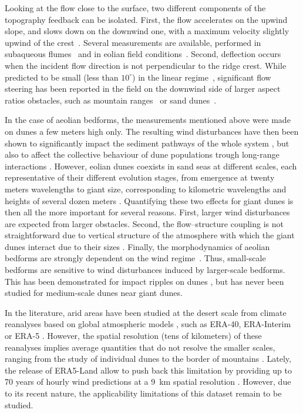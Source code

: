 Looking at the flow close to the surface, two different components of the topography feedback can be isolated. First, the flow accelerates on the upwind slope, and slows down on the downwind one, with a maximum velocity slightly upwind of the crest~\citep{Jackson1975, Sykes1980, Hunt1988}. Several measurements are available, performed in subaqueous flumes~\citep{Zilker1977, Zilker1979, Frederick1988} and in eolian field conditions~\citep{Claudin2013, Lu2021}. Second, deflection occurs when the incident flow direction is not perpendicular to the ridge crest. While predicted to be small (less than $10^{\circ}$) in the linear regime~\citep{Gadal2019}, significant flow steering has been reported in the field on the downwind side of larger aspect ratios obstacles, such as mountain ranges~\citep{Kim2000, Lewis2008, Fernando2019} or sand dunes~\citep{Walker2009, Walker2013, Hesp2015, Smith2017}.

In the case of aeolian bedforms, the measurements mentioned above were made on dunes a few meters high only. The resulting wind disturbances have then been shown to significantly impact the sediment pathways of the whole system \citep{Hesp2015}, but also to affect the collective behaviour of dune populations trough long-range interactions \citep{Bacik2020}.
%
However, eolian dunes coexists in sand seas at different scales, each representative of their different evolution stages, from emergence at twenty meters wavelengths to giant size, corresponding to kilometric wavelengths and heights of several dozen meters \citep{McKee1979}. Quantifying these two effects for giant dunes is then all the more important for several reasons.
%
First, larger wind disturbances are expected from larger obstacles.
%
Second, the flow--structure coupling is not straightforward due to vertical structure of the atmosphere with which the giant dunes interact due to their sizes \citep{andreotti2009}.
%
Finally, the morphodynamics of aeolian bedforms are strongly dependent on the wind regime~\citep{Livingstone1996}. Thus, small-scale bedforms are sensitive to wind disturbances induced by larger-scale bedforms. This has been demonstrated for impact ripples on dunes \citep{Howard1977,Hood2021}, but has never been studied for medium-scale dunes near giant dunes.

In the literature, arid areas have been studied at the desert scale from climate reanalyses based on global atmospheric models \citep{Blumberg1996, Livingstone2010, Ashkenazy2012, Jolivet2021, Hu2021}, such as ERA-40, ERA-Interim or ERA-5 \citep{Uppala2005, Dee2011, Hersbach2020}. However, the spatial resolution (tens of kilometers) of these reanalyses implies average quantities that do not resolve the smaller scales, ranging from the study of individual dunes to the border of mountains \citep{Livingstone2010}. Lately, the release of ERA5-Land allow to push back this limitation by providing up to 70 years of hourly wind predictions at a 9~km spatial resolution \citep{munoz2021}. However, due to its recent nature, the applicability limitations of this dataset remain to be studied.

